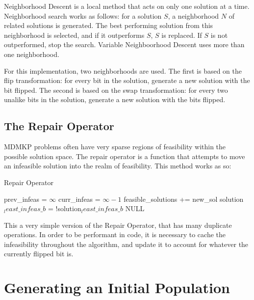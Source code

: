 \documentclass[11pt, letterpaper, onecolumn]{article}
\begin{document}
Neighborhood Descent is a local method that acts on only one solution at a time. Neighborhood search works as follows: for a solution $S$, a neighborhood $N$ of related solutions is generated. The best performing solution from this neighborhood is selected, and if it outperforms $S$, $S$ is replaced. If $S$ is not outperformed, stop the search. Variable Neighboorhood Descent uses more than one neighborhood. 

For this implementation, two neighborhoods are used. The first is based on the flip transformation: for every bit in the solution, generate a new solution with the bit flipped. The second is based on the swap transformation: for every two unalike bits in the solution, generate a new solution with the bits flipped.  

\subsection{The Repair Operator}

MDMKP problems often have very sparse regions of feasibility within the possible solution space. The repair operator is a function that attempts to move an infeasible solution into the realm of feasibility. This method works as so:  

\begin{algorithm}
\caption{Repair Operator}
\begin{algorithmic}
\STATE prev\_infeas = $\infty$
\STATE curr\_infeas = $\infty-1$
\STATE feasible\_solutions += new\_sol
\ENDIF
\ENDIF
\ENDFOR
{}
\ENDIF
\STATE solution$_least\_infeas\_b$ = !solution$_least\_infeas\_b$
\ENDWHILE
\RETURN NULL
\end{algorithmic}
\end{algorithm}

This a very simple version of the Repair Operator, that has many duplicate operations. In order to be performant in code, it is necessary to cache the infeasibility throughout the algorithm, and update it to account for whatever the currently flipped bit is. 

\section{Generating an Initial Population}
\end{document}
